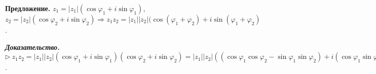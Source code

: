 \vspace{\baselineskip}
\textbf{Предложение.} $z_1 = |z_1| (\cos \varphi_1 + i \sin \varphi_1)$, $z_2 = |z_2| (\cos \varphi_2 + i \sin \varphi_2) \Rightarrow z_1 z_2 = |z_1| |z_2| (\cos (\varphi_1 + \varphi_2) + i \sin(\varphi_1 + \varphi_2)$.

\vspace{\baselineskip}
\textbf{\textit{Доказательство.}} $\rhd \ z_1 z_2 = |z_1||z_2|(\cos \varphi_1 + i \sin \varphi_1)(\cos \varphi_2 + i \sin \varphi_2) = |z_1||z_2|((\cos \varphi_1 \cos \varphi_2 - \sin \varphi_1 \sin \varphi_2) + i(\cos \varphi_1 \sin \varphi_2 + \sin \varphi_1 \cos \varphi_2)) = |z_1| |z_2| (\cos (\varphi_1 + \varphi_2) + i \sin(\varphi_1 + \varphi_2) \ \lhd$.

